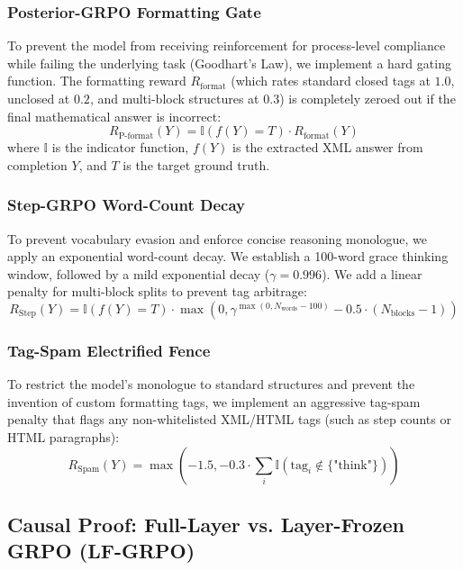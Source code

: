 \documentclass[11pt]{article}
\begin{document}
\subsubsection{Posterior-GRPO Formatting Gate}
To prevent the model from receiving reinforcement for process-level compliance while failing the underlying task (Goodhart's Law), we implement a hard gating function. The formatting reward $R_{\text{format}}$ (which rates standard closed tags at $1.0$, unclosed at $0.2$, and multi-block structures at $0.3$) is completely zeroed out if the final mathematical answer is incorrect:
\begin{equation}
R_{\text{P-format}}(Y) = \mathbb{I}\left(f(Y) = T\right) \cdot R_{\text{format}}(Y)
\end{equation}
where $\mathbb{I}$ is the indicator function, $f(Y)$ is the extracted XML answer from completion $Y$, and $T$ is the target ground truth.

\subsubsection{Step-GRPO Word-Count Decay}
To prevent vocabulary evasion and enforce concise reasoning monologue, we apply an exponential word-count decay. We establish a 100-word grace thinking window, followed by a mild exponential decay ($\gamma = 0.996$). We add a linear penalty for multi-block splits to prevent tag arbitrage:
\begin{equation}
R_{\text{Step}}(Y) = \mathbb{I}\left(f(Y) = T\right) \cdot \max\left(0, \gamma^{\max(0, N_{\text{words}} - 100)} - 0.5 \cdot (N_{\text{blocks}} - 1)\right)
\end{equation}

\subsubsection{Tag-Spam Electrified Fence}
To restrict the model's monologue to standard structures and prevent the invention of custom formatting tags, we implement an aggressive tag-spam penalty that flags any non-whitelisted XML/HTML tags (such as step counts or HTML paragraphs):
\begin{equation}
R_{\text{Spam}}(Y) = \max\left(-1.5, -0.3 \cdot \sum_{i} \mathbb{I}\left(\text{tag}_i \notin \{\text{"think"}\}\right)\right)
\end{equation}

\subsection{Causal Proof: Full-Layer vs. Layer-Frozen GRPO (LF-GRPO)}
\end{document}
